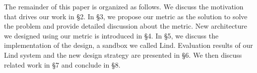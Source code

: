 The remainder of this paper is organized as follows. 
We discuss the motivation that drives our work in \S{2}. 
In \S{3}, we propose our metric as the solution to solve the problem and provide detailed discussion about the metric.
New architecture we designed using our metric is introduced in \S{4}. In \S{5}, we discuss the implementation of the design, a sandbox we called Lind. 
Evaluation results of our Lind system and the new design strategy are presented in \S{6}. 
We then discuss related work in \S{7} and conclude in \S{8}. 